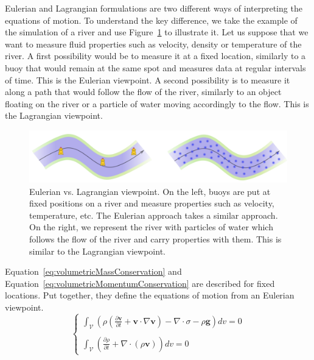 Eulerian and Lagrangian formulations are two different ways of interpreting the equations of motion.
To understand the key difference, we take the example of the simulation of a river and use Figure~\ref{fig:EulerianVsLagrangian} to illustrate it.
Let us suppose that we want to measure fluid properties such as velocity, density or temperature of the river.
A first possibility would be to measure it at a fixed location, similarly to a buoy that would remain at the same spot and measures data at regular intervals of time. This is the Eulerian viewpoint. A second possibility is to measure it along a path that would follow the flow of the river, similarly to an object floating on the river or a particle of water moving accordingly to the flow. This is the Lagrangian viewpoint.
\begin{figure}[!ht]
	\centering
	\includegraphics[width=\linewidth]{images/continuum_mechanics/eulerianVsLagrangian.png}
	\caption[STAR mechanics: Eulerian vs. Lagrangian]{\label{fig:EulerianVsLagrangian} Eulerian vs. Lagrangian viewpoint. On the left, buoys are put at fixed positions on a river and measure properties such as velocity, temperature, etc. The Eulerian approach takes a similar approach. On the right, we represent the river with particles of water which follows the flow of the river and carry properties with them. This is similar to the Lagrangian viewpoint.}
\end{figure}
Equation~\ref{eq:volumetricMassConservation} and Equation~\ref{eq:volumetricMomentumConservation} are described for fixed locations. Put together, they define the equations of motion from an Eulerian viewpoint.
\begin{equation}
\label{eq:eulerianMotionEquation}
\left\lbrace
\begin{array}{l}
\displaystyle 
\int_{\mathcal{V}} 
\left( 
\rho \left( \frac{\partial\mathbf{v}}{\partial t} + \mathbf{v} \cdot \nabla \mathbf{v} \right)
- \nabla \cdot \sigma - \rho \mathbf{g}  \right) dv = 0 
\\ \\
\displaystyle
\int_{\mathcal{V}} 
\left( \frac{\partial \rho}{\partial t} + \nabla \cdot \left( \rho  \mathbf{v} \right) \right) dv = 0
\end{array}
\right.
\end{equation}
